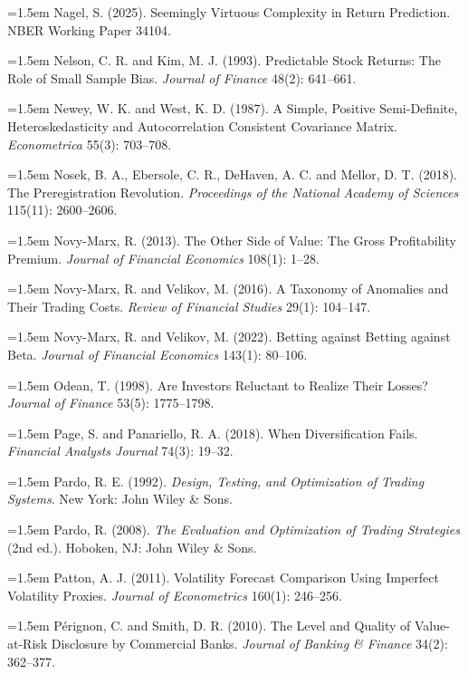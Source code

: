 \hangindent=1.5em Nagel, S. (2025). Seemingly Virtuous Complexity in Return Prediction. NBER Working Paper 34104.

\hangindent=1.5em Nelson, C. R. and Kim, M. J. (1993). Predictable Stock Returns: The Role of Small Sample Bias. \emph{Journal of Finance} 48(2): 641--661.

\hangindent=1.5em Newey, W. K. and West, K. D. (1987). A Simple, Positive Semi-Definite, Heteroskedasticity and Autocorrelation Consistent Covariance Matrix. \emph{Econometrica} 55(3): 703--708.

\hangindent=1.5em Nosek, B. A., Ebersole, C. R., DeHaven, A. C. and Mellor, D. T. (2018). The Preregistration Revolution. \emph{Proceedings of the National Academy of Sciences} 115(11): 2600--2606.

\hangindent=1.5em Novy-Marx, R. (2013). The Other Side of Value: The Gross Profitability Premium. \emph{Journal of Financial Economics} 108(1): 1--28.

\hangindent=1.5em Novy-Marx, R. and Velikov, M. (2016). A Taxonomy of Anomalies and Their Trading Costs. \emph{Review of Financial Studies} 29(1): 104--147.

\hangindent=1.5em Novy-Marx, R. and Velikov, M. (2022). Betting against Betting against Beta. \emph{Journal of Financial Economics} 143(1): 80--106.

\hangindent=1.5em Odean, T. (1998). Are Investors Reluctant to Realize Their Losses? \emph{Journal of Finance} 53(5): 1775--1798.

\hangindent=1.5em Page, S. and Panariello, R. A. (2018). When Diversification Fails. \emph{Financial Analysts Journal} 74(3): 19--32.

\hangindent=1.5em Pardo, R. E. (1992). \emph{Design, Testing, and Optimization of Trading Systems}. New York: John Wiley \& Sons.

\hangindent=1.5em Pardo, R. (2008). \emph{The Evaluation and Optimization of Trading Strategies} (2nd ed.). Hoboken, NJ: John Wiley \& Sons.

\hangindent=1.5em Patton, A. J. (2011). Volatility Forecast Comparison Using Imperfect Volatility Proxies. \emph{Journal of Econometrics} 160(1): 246--256.

\hangindent=1.5em P\'erignon, C. and Smith, D. R. (2010). The Level and Quality of Value-at-Risk Disclosure by Commercial Banks. \emph{Journal of Banking \& Finance} 34(2): 362--377.

